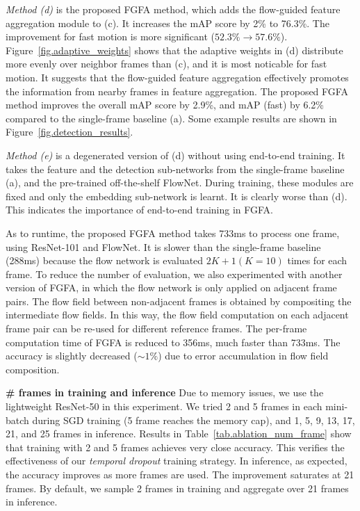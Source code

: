 \documentclass[10pt,twocolumn,letterpaper]{article}
\begin{document}
\emph{Method (d)} is the proposed FGFA method, which adds the flow-guided feature aggregation module to (c). It increases the mAP score by 2\% to 76.3\%. The improvement for fast motion is more significant ($52.3\% \rightarrow 57.6\%$). Figure~\ref{fig.adaptive_weights} shows that the adaptive weights in (d) distribute more evenly over neighbor frames than (c), and it is most noticable for fast motion. It suggests that the flow-guided feature aggregation effectively promotes the information from nearby frames in feature aggregation. The proposed FGFA method improves the overall mAP score by  2.9\%, and mAP (fast) by 6.2\% compared to the single-frame baseline (a). Some example results are shown in Figure~\ref{fig.detection_results}.

\emph{Method (e)} is a degenerated version of (d) without using end-to-end training. It takes the feature and the detection sub-networks from the single-frame baseline (a), and the pre-trained off-the-shelf FlowNet. During training, these modules are fixed and only the embedding sub-network is learnt. It is clearly worse than (d). This indicates the importance of end-to-end training in FGFA.

As to runtime, the proposed FGFA method takes 733ms to process one frame, using ResNet-101 and FlowNet. It is slower than the single-frame baseline (288ms) because the flow network is evaluated $2K+1 (K = 10)$ times for each frame. To reduce the number of evaluation, we also experimented with another version of FGFA, in which the flow network is only applied on adjacent frame pairs. The flow field between non-adjacent frames is obtained by compositing the intermediate flow fields. In this way, the flow field computation on each adjacent frame pair can be re-used for different reference frames. The per-frame computation time of FGFA is reduced to 356ms, much faster than 733ms. The accuracy is slightly decreased ($\sim 1\%$) due to error accumulation in flow field composition.

\textbf{\# frames in training and inference} Due to memory issues, we use the lightweight ResNet-50 in this experiment. We tried 2 and 5 frames in each mini-batch during SGD training (5 frame reaches the memory cap), and 1, 5, 9, 13, 17, 21, and 25 frames in inference. Results in Table~\ref{tab.ablation_num_frame} show that training with 2 and 5 frames achieves very close accuracy. This verifies the effectiveness of our \emph{temporal dropout} training strategy. In inference, as expected, the accuracy improves as more frames are used. The improvement saturates at 21 frames. By default, we sample 2 frames in training and aggregate over 21 frames in inference.
\end{document}
